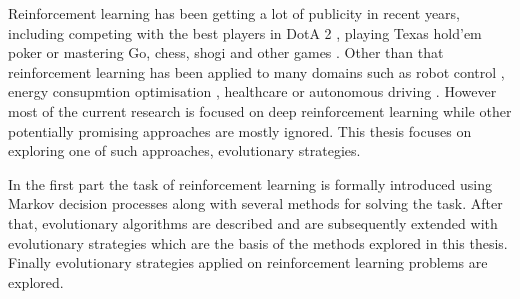 


Reinforcement learning has been getting a lot of publicity in recent years, including competing with the best players in DotA 2 \cite{openai2019dota}, playing Texas hold'em poker \cite{Brown885} or mastering Go, chess, shogi and other games \cite{Schrittwieser2020}. Other than that reinforcement learning has been applied to many domains such as robot control \cite{openai2019solving}, energy consupmtion optimisation \cite{LISSA2021100043}, healthcare \cite{yu2020reinforcement} or autonomous driving \cite{kiran2021deep}. However most of the current research is focused on deep reinforcement learning while other potentially promising approaches are mostly ignored. This thesis focuses on exploring one of such approaches, evolutionary strategies.

In the first part the task of reinforcement learning is formally introduced using Markov decision processes along with several methods for solving the task. After that, evolutionary algorithms are described and are subsequently extended with evolutionary strategies which are the basis of the methods explored in this thesis. Finally evolutionary strategies applied on reinforcement learning problems are explored.